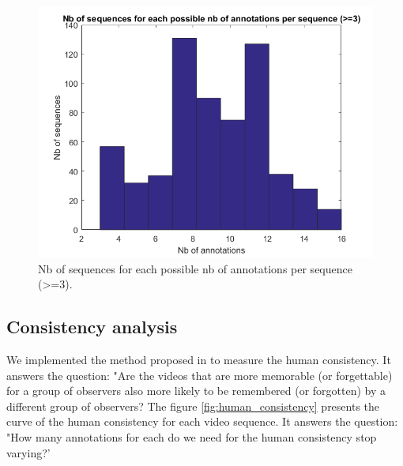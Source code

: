 \documentclass[sigconf]{acmart}
\begin{document}
\begin{figure}[!htbp]
	\centering
	\includegraphics[width=\columnwidth]{figures/histogram_nb_sequences_for_nb_of_annotations.png}
	\caption{\label{fig:nb_annotations_per_sequence}Nb of sequences for each possible nb of annotations per sequence (>=3).}
\end{figure}


\subsection{Consistency analysis}
We implemented the method proposed in \cite{isola_2014_makes} to measure the human consistency. It answers the question: "Are the videos that are more memorable (or forgettable) for a group of observers also more likely to be remembered (or forgotten) by a different group of observers? The figure \ref{fig:human_consistency} presents the curve of the human consistency for each video sequence. It answers the question: "How many annotations for each do we need for the human consistency stop varying?'
\end{document}
